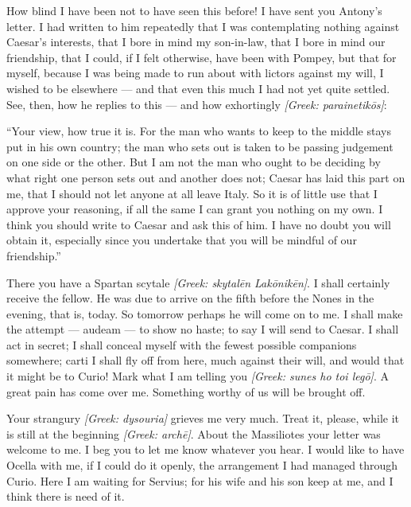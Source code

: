 

 How blind I have been not to have seen this before! I have sent you Antony's letter. I had written to him repeatedly that I was contemplating nothing against Caesar's interests, that I bore in mind my son-in-law, that I bore in mind our friendship, that I could, if I felt otherwise, have been with Pompey, but that for myself, because I was being made to run about with lictors against my will, I wished to be elsewhere --- and that even this much I had not yet quite settled. See, then, how he replies to this --- and how exhortingly \textit{[Greek: parainetik\=os]}:

 ``Your view, how true it is. For the man who wants to keep to the middle stays put in his own country; the man who sets out is taken to be passing judgement on one side or the other. But I am not the man who ought to be deciding by what right one person sets out and another does not; Caesar has laid this part on me, that I should not let anyone at all leave Italy. So it is of little use that I approve your reasoning, if all the same I can grant you nothing on my own. I think you should write to Caesar and ask this of him. I have no doubt you will obtain it, especially since you undertake that you will be mindful of our friendship.''

 There you have a Spartan scytale \textit{[Greek: skytal\=en Lak\=onik\=en]}. I shall certainly receive the fellow. He was due to arrive on the fifth before the Nones in the evening, that is, today. So tomorrow perhaps he will come on to me. I shall make the attempt --- \dag{}audeam\dag{} --- to show no haste; to say I will send to Caesar. I shall act in secret; I shall conceal myself with the fewest possible companions somewhere; \dag{}carti\dag{} I shall fly off from here, much against their will, and would that it might be to Curio! Mark what I am telling you \textit{[Greek: sunes ho toi leg\=o]}. A great pain has come over me. Something worthy of us will be brought off.

 Your strangury \textit{[Greek: dysouria]} grieves me very much. Treat it, please, while it is still at the beginning \textit{[Greek: arch\=e]}. About the Massiliotes your letter was welcome to me. I beg you to let me know whatever you hear. I would like to have Ocella with me, if I could do it openly, the arrangement I had managed through Curio. Here I am waiting for Servius; for his wife and his son keep at me, and I think there is need of it.

